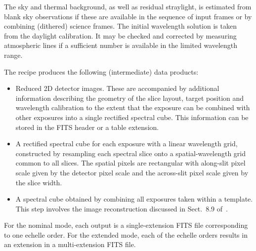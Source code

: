 The sky and thermal background, as well as residual straylight, is
estimated from blank sky observations if these are available in the
sequence of input frames or by combining (dithered) science
frames. The initial wavelength solution is taken from the daylight
calibration. It may be checked and corrected by measuring atmospheric
lines if a sufficient number is available in the limited wavelength
range.

The recipe produces the following (intermediate) data products:
\begin{itemize}\item Reduced 2D detector images. These are accompanied by additional
  information describing the geometry of the slice layout, target
  position and wavelength calibration to the extent that the exposure can be
  combined with other exposures into a single rectified spectral cube.
  This information can be stored in the FITS header or a table
  extension.
\item A rectified spectral cube for each exposure with a linear
  wavelength grid, constructed by resampling each spectral slice onto
  a spatial-wavelength grid common to all slices. The spatial pixels
  are rectangular with along-slit pixel scale given by the detector
  pixel scale and the across-slit pixel scale given by the slice
  width.
\item A spectral cube obtained by combining all exposures taken within
  a template. This step involves the image reconstruction discussed in
  Sect.~8.9 of~\cite{DRLS}.
\end{itemize}

For the nominal mode, each output is a single-extension FITS file
corresponding to one echelle order. For the extended mode, each of the
echelle orders results in an extension in a multi-extension FITS
file.


